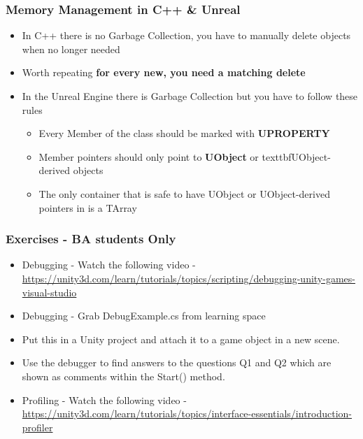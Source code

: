 \begin{frame}
	\frametitle{Memory Management in C++ \& Unreal}
	\begin{itemize}
	\item In C++ there is no Garbage Collection, you have to manually delete objects when no longer needed
  	\item Worth repeating  \textbf{for every new, you need a matching delete}
  	\item In the Unreal Engine there is Garbage Collection but you have to follow these rules
  	\begin{itemize}
  		\item Every Member of the class should be marked with \textbf{UPROPERTY}
  		\item Member pointers should only point to \textbf{UObject} or texttbf{UObject-derived objects}
  		\item The only container that is safe to have UObject or UObject-derived pointers in is a TArray
  	\end{itemize}
	\end{itemize}
\end{frame}

\begin{frame}
\frametitle{Exercises - BA students Only}
\begin{itemize}
	\item Debugging - Watch the following video - \url{https://unity3d.com/learn/tutorials/topics/scripting/debugging-unity-games-visual-studio}
	\item Debugging - Grab DebugExample.cs from learning space
	\item Put this in a Unity project and attach it to a game object in a new scene.
	\item Use the debugger to find answers to the questions Q1 and Q2 which are shown as comments within the Start() method.
	\item Profiling - Watch the following video - \url{https://unity3d.com/learn/tutorials/topics/interface-essentials/introduction-profiler}
\end{itemize}
\end{frame}


